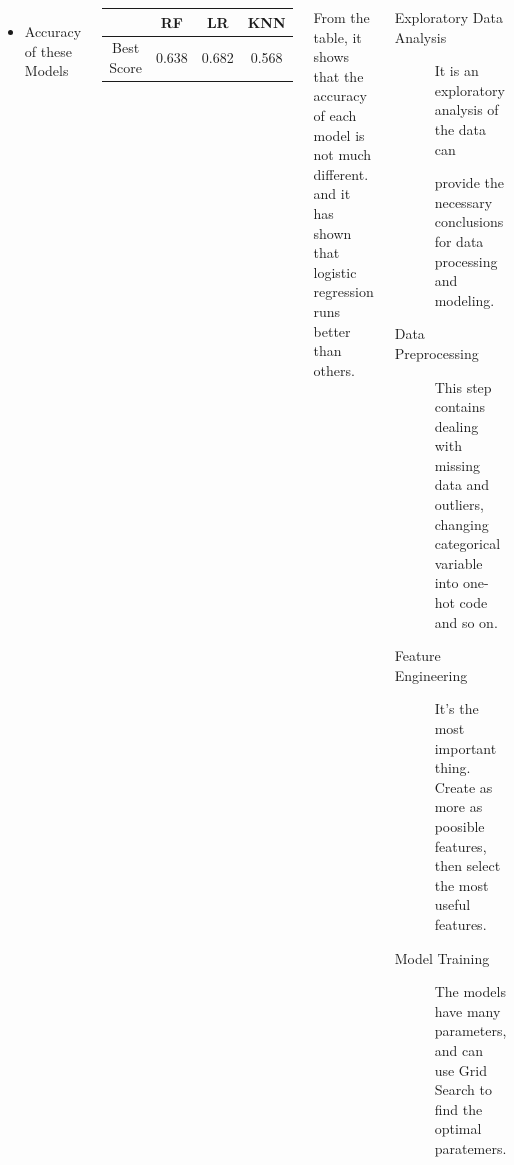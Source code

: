 \documentclass{tikzposter} %
\begin{document}
\begin{columns}
{\begin{description}
\end{description}
	\vspace{.5cm}

\begin{itemize}
	\item Accuracy of these Models
\end{itemize}
\vspace{.5cm}
	\begin{center}

		\begin{tabular}{cccc}
	
				\hline
			& RF  & LR  & KNN \\
				\hline
			Best Score & 0.638  & 0.682  & 0.568\\
				\hline
		\end{tabular}

	\end{center}

From the table,
it shows that the accuracy of 
each model is not much different.
and  it has shown that logistic regression runs better than others.
\newline
	
}


{
	\begin{description}
		\item[Exploratory Data Analysis] It is an 
		exploratory analysis of the data can 
		 
		provide the necessary conclusions 
		for data processing and modeling.
		\vspace{.5cm}
		\item[Data Preprocessing] This step contains
		dealing with missing data and outliers,
		changing categorical variable 
		into one-hot code and so on.
		\vspace{.5cm}
		\item[Feature Engineering] It's the 
		most important thing.
		Create as more as poosible features,
		then select the most useful features.
		\vspace{.5cm}
		\item[Model Training] The models have 
		many parameters,
		and can use Grid Search to find 
		the optimal paratemers.	
	\end{description}
}



\end{columns}
\end{document}
